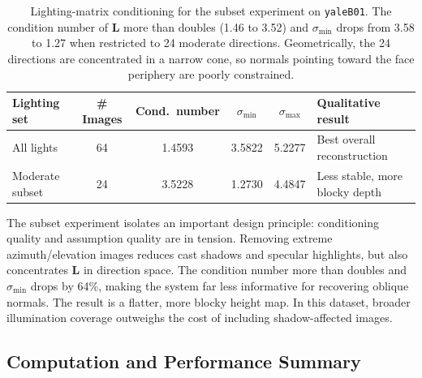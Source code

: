 {\begin{table}[htbp]
\centering
\small
\begin{tabular}{l|c|c|c|c|l}
\hline
Lighting set & \# Images & Cond.\ number & $\sigma_{\min}$ & $\sigma_{\max}$ & Qualitative result \\
\hline
All lights      & 64 & 1.4593 & 3.5822 & 5.2277 & Best overall reconstruction \\
Moderate subset & 24 & 3.5228 & 1.2730 & 4.4847 & Less stable, more blocky depth \\
\hline
\end{tabular}
\caption{Lighting-matrix conditioning for the subset experiment on \texttt{yaleB01}.
The condition number of $\mathbf{L}$ more than doubles (1.46 to 3.52) and
$\sigma_{\min}$ drops from 3.58 to 1.27 when restricted to 24 moderate directions.
Geometrically, the 24 directions are concentrated in a narrow cone, so normals
pointing toward the face periphery are poorly constrained.}
\label{tab:part2_subset}
\end{table}

The subset experiment isolates an important design principle: conditioning quality
and assumption quality are in tension.  Removing extreme azimuth/elevation images
reduces cast shadows and specular highlights, but also concentrates $\mathbf{L}$
in direction space.  The condition number more than doubles and $\sigma_{\min}$
drops by 64\%, making the system far less informative for recovering oblique
normals.  The result is a flatter, more blocky height map.  In this dataset,
broader illumination coverage outweighs the cost of including shadow-affected images.

\subsection*{Computation and Performance Summary}

}
